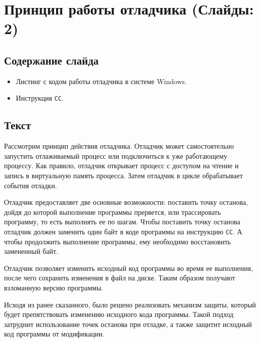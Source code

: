 
\section{Принцип работы отладчика (Слайды: 2)}

\subsection{Содержание слайда}

\begin{itemize}
  \item Листинг с кодом работы отладчика в системе Windows.
  \item Инструкция \verb!CC!.
\end{itemize}

\subsection{Текст}

Рассмотрим принцип действия отладчика. Отладчик может самостоятельно запустить
отлаживаемый процесс или подключиться к уже работающему процессу. Как правило,
отладчик открывает процесс с доступом на чтение и запись в виртуальную память
процесса. Затем отладчик в цикле обрабатывает события отладки.

Отладчик предоставляет две основные возможности: поставить точку останова, дойдя
до которой выполнение программы прервется, или трассировать программу, то есть
выполнять ее по шагам. Чтобы поставить точку останова отладчик должен заменить
один байт в коде программы на инструкцию \verb!CC!. А чтобы продолжить
выполнение программы, ему необходимо восстановить замененный байт. 

Отладчик позволяет изменить исходный код программы во время ее выполнения, после
чего сохранить изменения в файл на диске. Таким образом получают взломанную
версию программы.

Исходя из ранее сказанного, было решено реализовать механизм защиты, который
будет препятствовать изменению исходного кода программы. Такой подход затруднит
использование точек останова при отладке, а также защитит исходный код программы
от модификации.
